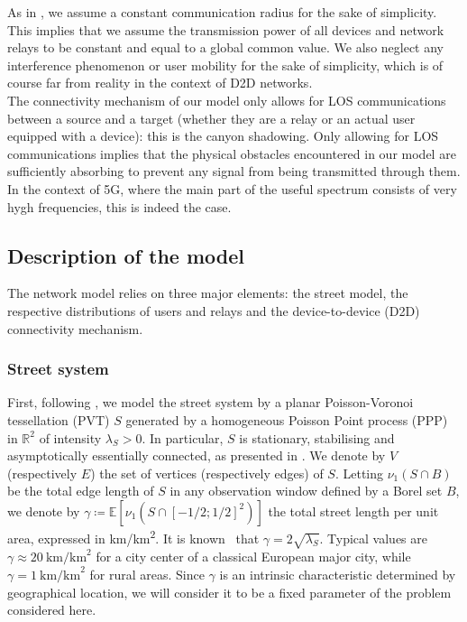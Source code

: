 \documentclass[conference]{IEEEtran}
\begin{document}
\indent As in \cite{glauche_continuum_2003}, we assume a constant communication radius for the sake of simplicity. This implies that we assume the transmission power of all devices and network relays to be constant and equal to a global common value. We also neglect any interference phenomenon or user mobility for the sake of simplicity, which is of course far from reality in the context of D2D networks. \\
\indent The connectivity mechanism 
of our model only allows for LOS communications between a source and a target (whether they are a relay or an actual user equipped with a device): this is the canyon shadowing. %
Only allowing for LOS communications implies that the physical obstacles encountered in our model are sufficiently absorbing to prevent any signal from being transmitted through them. In the context of 5G, where the main part of the useful spectrum consists of very hygh frequencies, this is indeed the case. %

\subsection{Description of the model}
The network model relies on three major elements: the street model, the respective distributions of users and relays and the device-to-device (D2D) connectivity mechanism. \\
\subsubsection{Street system}
\indent First, following \cite{courtat_promenade_2012,gloaguen2006fitting}, we model the street system by a planar Poisson-Voronoi tessellation (PVT) $S$ generated by a homogeneous Poisson Point process (PPP) in $\mathbb{R}^{2}$ of intensity $\lambda_{S} > 0$. In particular, $S$ is stationary, stabilising and asymptotically essentially connected, as presented in \cite{hirsch_continuum_2017}. We denote by $V$ (respectively $E$) the set of vertices (respectively edges) of $S$. Letting $\nu_{1}(S \cap B)$ be the total edge length of $S$ in any observation window defined by a Borel set $B$, we  denote by $\gamma \coloneqq \mathbb{E}\left[\nu_{1}\left(S \cap \left[-1/2;1/2\right]^{2}\right)\right]$ the total street length per unit area, expressed in km/km\textsuperscript{2}. It is  known~\cite{moller_random_1989,moller_lectures_2012} that $\gamma = 2\sqrt{\lambda_{S}}$. Typical values are $\gamma \approx 20 \: \text{km/km}^{2}$ for a city center of a classical European major city, while $\gamma = 1  \: \text{km/km}^{2}$ for rural areas.
Since $\gamma$ is an intrinsic characteristic determined by geographical location, we will consider it to be a fixed parameter of the problem considered here.  \\ %
\end{document}
